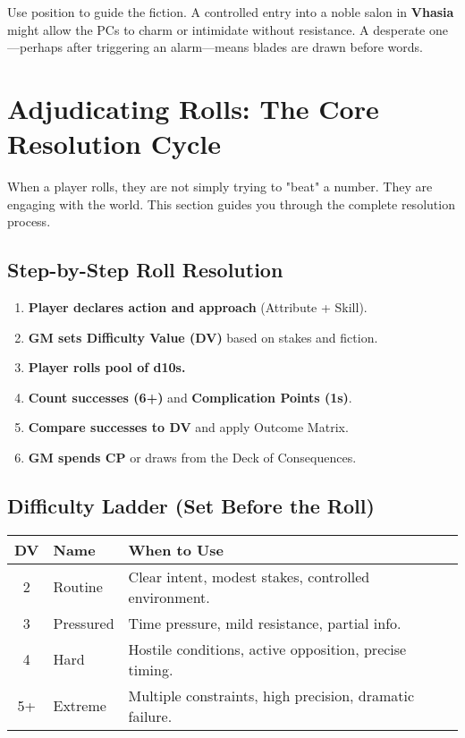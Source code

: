 Use position to guide the fiction. A controlled entry into a noble salon in \textbf{Vhasia} might allow the PCs to charm or intimidate without resistance. A desperate one---perhaps after triggering an alarm---means blades are drawn before words.

\section{Adjudicating Rolls: The Core Resolution Cycle}

When a player rolls, they are not simply trying to "beat" a number. They are engaging with the world. This section guides you through the complete resolution process.

\subsection{Step-by-Step Roll Resolution}

\begin{enumerate}
    \item \textbf{Player declares action and approach} (Attribute + Skill).
    \item \textbf{GM sets Difficulty Value (DV)} based on stakes and fiction.
    \item \textbf{Player rolls pool of d10s.}
    \item \textbf{Count successes (6+)} and \textbf{Complication Points (1s)}.
    \item \textbf{Compare successes to DV} and apply Outcome Matrix.
    \item \textbf{GM spends CP} or draws from the Deck of Consequences.
\end{enumerate}

\subsection{Difficulty Ladder (Set Before the Roll)}

\begin{center}
\begin{tabular}{cll}
\toprule
\textbf{DV} & \textbf{Name} & \textbf{When to Use} \\
\midrule
2 & Routine\index{Difficulty Value!Routine} & Clear intent, modest stakes, controlled environment. \\
3 & Pressured\index{Difficulty Value!Pressured} & Time pressure, mild resistance, partial info. \\
4 & Hard\index{Difficulty Value!Hard} & Hostile conditions, active opposition, precise timing. \\
5+ & Extreme\index{Difficulty Value!Extreme} & Multiple constraints, high precision, dramatic failure. \\
\bottomrule
\end{tabular}
\end{center}

